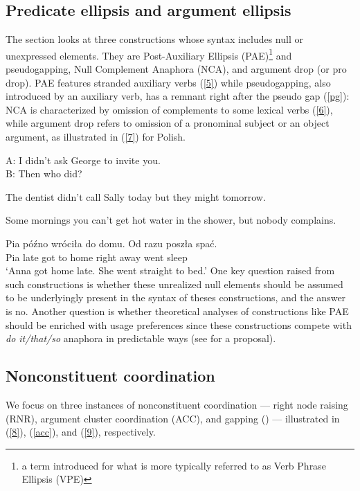 \documentclass[output=paper
	        ,collection
	        ,collectionchapter
 	        ,biblatex
                ,babelshorthands
                ,newtxmath
                ,draftmode
                ,colorlinks, citecolor=brown
]{langscibook}
\begin{document}
{\subsection{Predicate ellipsis and argument ellipsis}
The section looks at three constructions whose syntax includes null or unexpressed elements. They are Post-Auxiliary Ellipsis (PAE)\footnote{a term \citealt{Sag1976} introduced for what is more typically referred to as Verb Phrase Ellipsis (VPE)} and pseudogapping, Null Complement Anaphora (NCA), and argument drop (or pro drop). PAE features stranded auxiliary verbs (\ref{5}) while pseudogapping, also introduced by an auxiliary verb,
has a remnant right after the pseudo gap (\ref{pg}):
%
%
%
%
 NCA is characterized by omission of complements to some lexical verbs (\ref{6}), while argument drop refers to omission of a pronominal subject or an object argument, as illustrated in (\ref{7}) for Polish.

\ea A: I didn't ask George to invite you.\\B: Then who did?\label{5}\z

\ea The dentist didn't call Sally today but they might tomorrow. \label{pg}\z

\ea Some mornings you can't get hot water in the shower, but nobody complains. \label{6} \z

\ea
\gll Pia p\'{o}\'{z}no wr\'{o}ci\l a do domu. Od razu posz\l a spa\'{c}.\\
Pia late got to home right away went sleep\\
\glt `Anna got home late. She went straight to bed.'
\label{7}
\z
%
One key question raised from such constructions
 is whether these unrealized null elements should be assumed to be underlyingly present in the syntax of theses constructions, and the answer is no. Another question is whether theoretical analyses of constructions like PAE should be enriched with usage preferences since these constructions compete with \textit{do it/that/so} anaphora in predictable ways (see \citealt{Miller2011} for a proposal).


\subsection{Nonconstituent coordination}

We focus on three instances of nonconstituent coordination --- right node raising (RNR), argument
cluster coordination (ACC), and gapping (\citealt{Ross1967}) --- illustrated in (\ref{8}), (\ref{acc}), and (\ref{9}), respectively.

}
\end{document}
